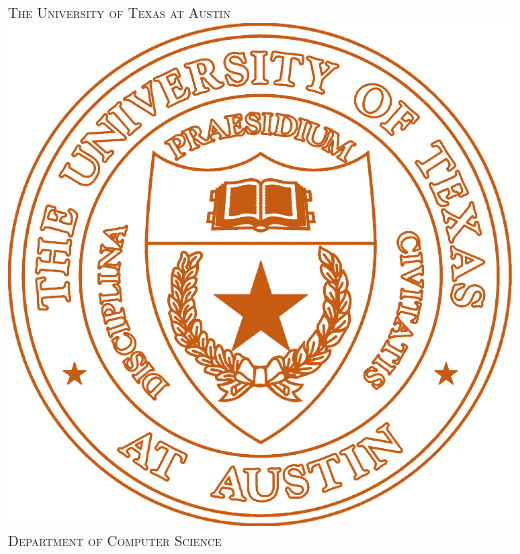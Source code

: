 \documentclass[12pt]{article} %
\begin{document}

\begin{titlepage}

\newcommand{\HRule}{\rule{\linewidth}{0.5mm}} %

\center %

\textsc{\LARGE The University of Texas at Austin}\\[1.5cm] %
\includegraphics[scale=0.75]{figures/UTSeal.png}\\[0.5cm] %
\textsc{\large Department of Computer Science}\\[0.5cm] %


\end{titlepage}
\end{document}

